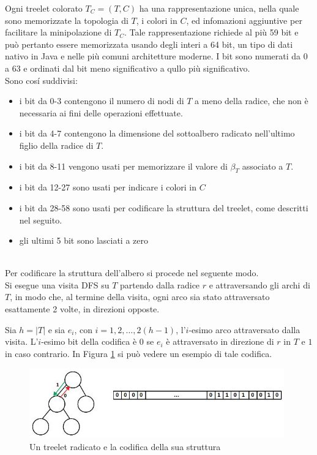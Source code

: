 Ogni treelet colorato $ T_C = (T,C) $ ha una rappresentazione unica, nella quale sono memorizzate la topologia di $ T $, i colori in $ C $, ed infomazioni aggiuntive per facilitare la minipolazione di $T_C$.
Tale rappresentazione richiede al pi\`u 59 bit e pu\`o pertanto essere memorizzata usando degli interi a 64 bit, un tipo di dati nativo in Java e nelle pi\`u comuni architetture moderne.
I bit sono numerati da 0 a 63 e ordinati dal bit meno significativo a qullo pi\`u significativo.\\
Sono cos\'i suddivisi:
\begin{itemize}
	\item i bit da 0-3 contengono il numero di nodi di $ T $ a meno della radice, che non \`e necessaria ai fini delle operazioni effettuate.
	\item i bit da 4-7 contengono la dimensione del sottoalbero radicato nell'ultimo figlio della radice di $ T $.
	\item i bit da 8-11 vengono usati per memorizzare il valore di $ \beta_T $ associato a $ T $.
	\item i bit da 12-27 sono usati per indicare i colori in $ C $
	\item i bit da 28-58 sono usati per codificare la struttura del treelet, come descritti nel seguito.
	\item gli ultimi 5 bit sono lasciati a zero
\end{itemize}\mbox{}\\

Per codificare la struttura dell'albero si procede nel seguente modo.\\
Si esegue una visita DFS su $ T $ partendo dalla radice $ r $ e attraversando gli archi di $ T $, in modo che, al termine della visita, ogni arco sia stato attraversato esattamente 2 volte, in direzioni opposte. 

Sia $h=|T|$ e sia $e_i$, con $i = 1, 2, \dots, 2(h-1)$, l'$i$-esimo arco attraversato dalla visita. 
L'$i$-esimo bit della codifica \`e $0$ se $e_i$ \`e attraversato in direzione di $r$ in $T$ e $1$ in caso contrario. In Figura \ref{figura} si pu\`o vedere un esempio di tale codifica.

\begin{figure}[htbp]
	\centering
	\includegraphics[width=11cm]{capitolo2/grafo3}
	\caption{Un treelet radicato e la codifica della sua struttura}
	\label{figura}
\end{figure}

